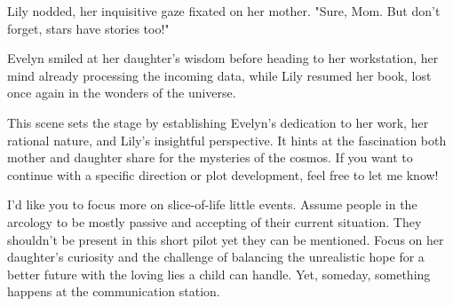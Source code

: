 \begin{aquote}
    Lily nodded, her inquisitive gaze fixated on her mother. "Sure, Mom. But don't forget, stars have stories too!"

    Evelyn smiled at her daughter's wisdom before heading to her workstation, her mind already processing the incoming data, while Lily resumed her book, lost once again in the wonders of the universe.\medskip

    This scene sets the stage by establishing Evelyn's dedication to her work, her rational nature, and Lily's insightful perspective. It hints at the fascination both mother and daughter share for the mysteries of the cosmos. If you want to continue with a specific direction or plot development, feel free to let me know!
\end{aquote}

\begin{qquote}
    I'd like you to focus more on slice-of-life little events. Assume people in the arcology to be mostly passive and accepting of their current situation. They shouldn't be present in this short pilot yet they can be mentioned. Focus on her daughter's curiosity and the challenge of balancing the unrealistic hope for a better future with the loving lies a child can handle. Yet, someday, something happens at the communication station.
\end{qquote}

